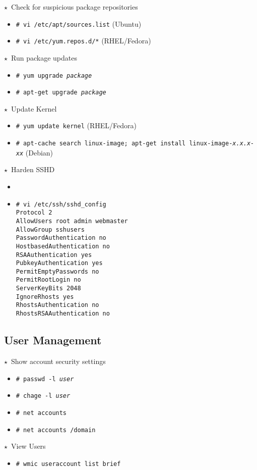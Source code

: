 \documentclass[10pt,landscape]{article}
\newcommand{\os}[1]{\texttt{\footnotesize{#1}}}
\newcommand{\unix}{\os{U}}
\newcommand{\linux}{\os{L}}
\newcommand{\windows}{\os{W}}
\newenvironment{action}[1]
  {\begin{minipage}[c]{\linewidth}$\star$~#1\begin{itemize}[leftmargin=1cm]}
  {\end{itemize}\end{minipage}\vspace*{3pt}}
\newcommand{\cmd}[2]{\item[#1] {\small\tt\# #2}}
\newcommand{\comment}[1]{\textrm{\small(#1)}}
\newcommand{\tool}[2]{\item[#1] {\footnotesize\sc{#2}}\xspace}
\begin{document}
\begin{multicols*}{3}
\begin{action}{Check for suspicious package repositories}
\cmd{\linux}{vi /etc/apt/sources.list} \comment{Ubuntu}
\cmd{\linux}{vi /etc/yum.repos.d/*} \comment{RHEL/Fedora}
\end{action}

\begin{action}{Run package updates}
\cmd{\linux}{yum upgrade \emph{package}}
\cmd{\linux}{apt-get upgrade \emph{package}}
\end{action}

\begin{action}{Update Kernel}
\cmd{\linux}{yum update kernel} \comment{RHEL/Fedora}
\cmd{\linux}{apt-cache search linux-image; apt-get install
  linux-image-\emph{x.x.x-xx}} \comment{Debian}
\end{action}

\begin{action}{Harden SSHD}
\tool{\unix}{fail2ban}
\cmd{\unix}{vi /etc/ssh/sshd\_config\\
  Protocol 2\\
  AllowUsers root admin webmaster\\
  AllowGroup sshusers\\
  PasswordAuthentication no\\
  HostbasedAuthentication no\\
  RSAAuthentication yes\\
  PubkeyAuthentication yes\\
  PermitEmptyPasswords no\\
  PermitRootLogin no\\
  ServerKeyBits 2048\\
  IgnoreRhosts yes\\
  RhostsAuthentication no\\
  RhostsRSAAuthentication no}
\end{action}

\subsection*{User Management}

\begin{action}{Show account security settings}
\cmd{\unix}{passwd -l \emph{user}}
\cmd{\linux}{chage -l \emph{user}}
\cmd{\windows}{net accounts}
\cmd{\windows}{net accounts /domain}
\end{action}

\begin{action}{View Users}
\cmd{\windows}{wmic useraccount list brief}
\end{action}


\end{multicols*}
\end{document}
